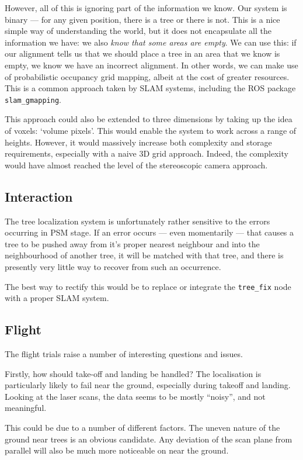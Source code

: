 \documentclass[12pt,oneside,a4paper]{book}
\begin{document}
However, all of this is ignoring part of the information we know. Our
system is binary --- for any given position, there is a tree or there
is not. This is a nice simple way of understanding the world, but it
does not encapsulate all the information we have: we also \emph{know
  that some areas are empty}. We can use this: if our alignment tells
us that we should place a tree in an area that we know is empty, we
know we have an incorrect alignment. In other words, we can make use
of probabilistic occupancy grid mapping, albeit at the cost of greater
resources. This is a common approach taken by SLAM systems, including
the ROS package \texttt{slam\_gmapping}.

This approach could also be extended to three dimensions by taking up
the idea of voxels: `volume pixels'. This would enable the system to
work across a range of heights. However, it would massively increase
both complexity and storage requirements, especially with a naive 3D
grid approach. Indeed, the complexity would have almost reached the
level of the stereoscopic camera approach.


\subsection{Interaction}
\label{sec:interaction}

The tree localization system is unfortunately rather sensitive to the
errors occurring in PSM stage. If an error occurs --- even momentarily
--- that causes a tree to be pushed away from it's proper nearest
neighbour and into the neighbourhood of another tree, it will be
matched with that tree, and there is presently very little way to
recover from such an occurrence.

The best way to rectify this would be to replace or integrate the
\texttt{tree\_fix} node with a proper SLAM system.

\subsection{Flight}
\label{sec:flight}

The flight trials raise a number of interesting questions and issues.

Firstly, how should take-off and landing be handled? The localisation
is particularly likely to fail near the ground, especially during
takeoff and landing. Looking at the laser scans, the data seems to be
mostly ``noisy'', and not meaningful.

This could be due to a number of different factors. The uneven nature
of the ground near trees is an obvious candidate. Any deviation of the
scan plane from parallel will also be much more noticeable on near the
ground.
\end{document}
